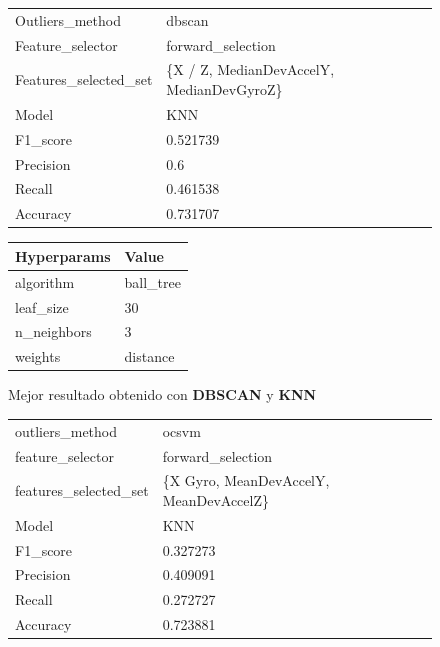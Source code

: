 \begin{appendices}
		\begin{figure}[htb]
			\centering
			\begin{tabular}{ll}
				\toprule
					  Outliers\_method &                                   dbscan \\
					 Feature\_selector &                        forward\_selection \\
				Features\_selected\_set & \{X / Z, MedianDevAccelY, MedianDevGyroZ\} \\
								Model &                                      KNN \\
						F1\_score &                                 0.521739 \\
					   Precision &                                      0.6 \\
						  Recall &                                 0.461538 \\
						Accuracy &                                 0.731707 \\
				\bottomrule
			\end{tabular}
			\newline
			\newline

			\begin{tabular}{ll}
				\toprule
				Hyperparams &     Value \\
				\midrule
				  algorithm & ball\_tree \\
				  leaf\_size &        30 \\
				n\_neighbors &         3 \\
					weights &  distance \\
				\bottomrule
			\end{tabular}
			\caption{Mejor resultado obtenido con \textbf{DBSCAN} y \textbf{KNN}}
			\label{table:16}
		\end{figure}

		\begin{figure}[htb]
			\centering
			\begin{tabular}{ll}
				\toprule
					  outliers\_method &                                  ocsvm \\
					 feature\_selector &                      forward\_selection \\
				features\_selected\_set & \{X Gyro, MeanDevAccelY, MeanDevAccelZ\} \\
								Model &                                    KNN \\
						F1\_score &                               0.327273 \\
					   Precision &                               0.409091 \\
						  Recall &                               0.272727 \\
						Accuracy &                               0.723881 \\
				\bottomrule
			\end{tabular}
			\newline
			\newline


\end{figure}
\end{appendices}
